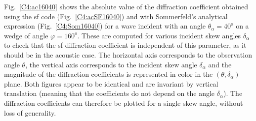 Fig.~\ref{C4:ac16040} shows the absolute value of the diffraction coefficient obtained using the \acrshort{sf} code (Fig.~\ref{C4:acSF16040}) and with Sommerfeld's analytical expression (Fig.~\ref{C4:Som16040}) for a wave incident with an angle $\theta_{\alpha}=40^o$ on a wedge of angle $\varphi=160^o$. These are computed for various incident skew angles $\delta_{\alpha}$ to check that the \acrshort{sf} diffraction coefficient is independent of this parameter, as it should be in the acoustic case. The horizontal axis corresponds to the observation angle $\theta$, the vertical axis corresponds to the incident skew angle $\delta_{\alpha}$ and the magnitude of the diffraction coefficients is represented in color in the $(\theta,\delta_{\alpha})$ plane. Both figures appear to be identical and are invariant by vertical translation (meaning that the coefficients do not depend on the angle $\delta_{\alpha}$). The diffraction coefficients can therefore be plotted for a single skew angle, without loss of generality. 

